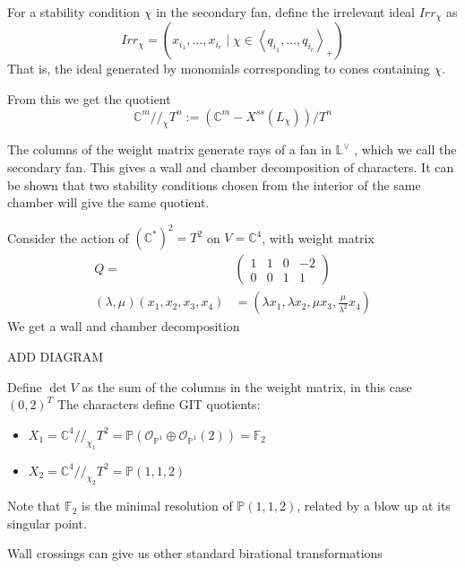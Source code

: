 \begin{definition}
	For a stability condition $\chi$ in the secondary fan, define the irrelevant ideal $Irr_\chi$ as $$
Irr_{\chi}= (x_{i_{1}},\dots,x_{i_{r}} \mid \chi \in \left< q_{i_{1}},\dots,q_{i_{r}}\right>_{+} )
$$ That is, the ideal generated by monomials corresponding to cones containing $\chi$. 
\end{definition}

From this we get the quotient $$
\mathbb{C}^{m}//_{\chi}T^{n}:= \left(\mathbb{C}^{m}-X^{ss}(L_{\chi})\right)  /T^n
$$

The columns of the weight matrix generate rays of a fan in $\mathbb{L}^\vee$ , which we call the secondary fan. This gives a wall and chamber decomposition of characters. It can be shown that two stability conditions chosen from the interior of the same chamber will give the same quotient. 

\begin{example}{}{}
	Consider the action of $(\mathbb{C}^{*})^{2}= T^2$ on $V = \mathbb{C}^4$, with weight matrix $$
\begin{align}
Q = &\begin{pmatrix}1&1&0&-2 \\ 0&0&1&1\end{pmatrix} \\
(\lambda,\mu)(x_1,x_2,x_3,x_{4})&= \left( \lambda x_{1}, \lambda x_{2},\mu x_{3}, \frac{\mu}{\lambda^{2}}x_4 \right)
\end{align}
$$
We get a wall and chamber decomposition 

ADD DIAGRAM

Define $\det V$ as the sum of the columns in the weight matrix, in this case $(0,2)^T$
The characters define GIT quotients: 
\begin{itemize}
	\item  $X_{1}= \mathbb{C}^{4}//_{\chi_{1}}T^{2}= \mathbb{P}(\mathcal{O}_{\mathbb{P}^{1}}\oplus \mathcal{O}_{\mathbb{P}^{1}}(2)) = \mathbb{F}_2$
	\item  $X_{2}= \mathbb{C}^{4}//_{\chi_{2}}T^{2}= \mathbb{P}(1,1,2)$
\end{itemize}

Note that $\mathbb{F}_2$ is the minimal resolution of $\mathbb{P}(1,1,2)$, related by a blow up at its singular point.
\end{example}

Wall crossings can give us other standard birational transformations

